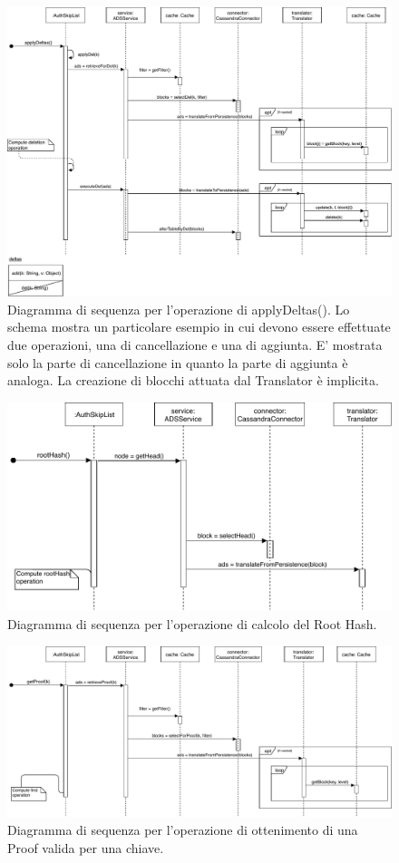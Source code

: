 	\begin{figure}
		\centering
		\includegraphics[scale=0.6]{figure/applyDeltasSD.pdf}
		\caption{Diagramma di sequenza per l'operazione di applyDeltas(). Lo schema mostra un particolare esempio in cui devono essere effettuate due operazioni, una di cancellazione e una di aggiunta. E' mostrata solo la parte di cancellazione in quanto la parte di aggiunta è analoga. La creazione di blocchi attuata dal Translator è implicita.}\label{fig:applyDeltasSD}
	\end{figure}

	\begin{figure}
		\centering
		\includegraphics[scale=0.6]{figure/rootHashSD.pdf}
		\caption{Diagramma di sequenza per l'operazione di calcolo del Root Hash.}\label{fig:rootHashSD}
	\end{figure}

	\begin{figure}
		\centering
		\includegraphics[scale=0.6]{figure/getProofSD.pdf}
		\caption{Diagramma di sequenza per l'operazione di ottenimento di una Proof valida per una chiave.}\label{fig:getProofSD}
	\end{figure}




